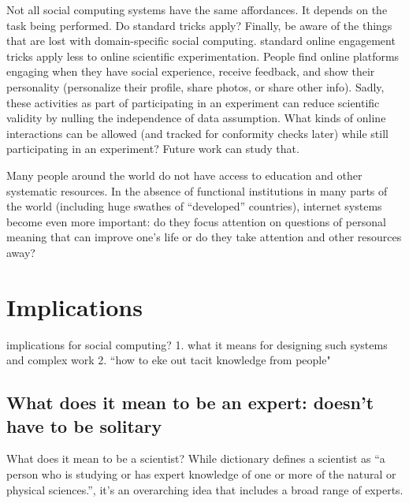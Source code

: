 Not all social computing systems have the same affordances. It depends on the task being performed. Do standard tricks apply? Finally, be aware of the things that are lost with domain-specific social computing. standard online engagement tricks apply less to online scientific experimentation. People find online platforms engaging when they have social experience, receive feedback, and show their personality (personalize their profile, share photos, or share other info). Sadly, these activities as part of participating in an experiment can reduce scientific validity by nulling the independence of data assumption. What kinds of online interactions can be allowed (and tracked for conformity checks later) while still participating in an experiment? Future work can study that.

Many people around the world do not have access to education and other systematic resources. In the absence of functional institutions in many parts of the world (including huge swathes of “developed” countries), internet systems become even more important:  do they focus attention on questions of personal meaning that can improve one’s life or do they take attention and other resources away?


\section{Implications}

implications for social computing?
1. what it means for designing such systems and complex work
2. “how to eke out tacit knowledge from people"

\subsection{What does it mean to be an expert: doesn’t have to be solitary} 
What does it mean to be a scientist? While dictionary defines a scientist as “a person who is studying or has expert knowledge of one or more of the natural or physical sciences.”, it’s an overarching idea that includes a broad range of experts. 


